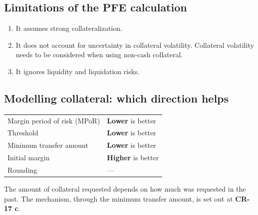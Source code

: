 \subsection*{Limitations of the PFE calculation}

\begin{enumerate}[label=\alph*)]
\item It assumes strong collateralization.
\item It does not account for uncertainty in collateral volatility. Collateral
volatility needs to be considered when using non-cash collateral.
\item It ignores liquidity and liquidation risks.
\end{enumerate}

\subsection*{Modelling collateral: which direction helps}

\begin{center}
\footnotesize
\begin{tabular}{L{5.4cm} L{9.1cm}}
\toprule
{} &  \\
\midrule
Margin period of risk (MPoR) & \textbf{Lower} is better \\
Threshold & \textbf{Lower} is better \\
Minimum transfer amount & \textbf{Lower} is better \\
Initial margin & \textbf{Higher} is better \\
Rounding & --- \\
\bottomrule
\end{tabular}
\end{center}

\begin{crtrapbox}
The amount of collateral requested depends on how much was requested in the past.
The mechanism, through the minimum transfer amount, is set out at
\textbf{CR-17 c}.
\end{crtrapbox}


